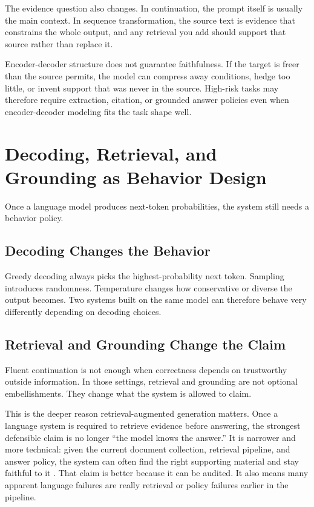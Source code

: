 \begin{practicalnote}
The evidence question also changes. In continuation, the prompt itself is usually the main context. In sequence transformation, the source text is evidence that constrains the whole output, and any retrieval you add should support that source rather than replace it.
\end{practicalnote}

\begin{warningbox}
Encoder-decoder structure does not guarantee faithfulness. If the target is freer than the source permits, the model can compress away conditions, hedge too little, or invent support that was never in the source. High-risk tasks may therefore require extraction, citation, or grounded answer policies even when encoder-decoder modeling fits the task shape well.
\end{warningbox}

\section{Decoding, Retrieval, and Grounding as Behavior Design}

Once a language model produces next-token probabilities, the system still needs a behavior policy.

\subsection{Decoding Changes the Behavior}

Greedy decoding always picks the highest-probability next token. Sampling introduces randomness. Temperature changes how conservative or diverse the output becomes. Two systems built on the same model can therefore behave very differently depending on decoding choices.

\subsection{Retrieval and Grounding Change the Claim}

Fluent continuation is not enough when correctness depends on trustworthy outside information. In those settings, retrieval and grounding are not optional embellishments. They change what the system is allowed to claim.

This is the deeper reason retrieval-augmented generation matters. Once a language system is required to retrieve evidence before answering, the strongest defensible claim is no longer ``the model knows the answer.'' It is narrower and more technical: given the current document collection, retrieval pipeline, and answer policy, the system can often find the right supporting material and stay faithful to it \citep{lewis2020rag}. That claim is better because it can be audited. It also means many apparent language failures are really retrieval or policy failures earlier in the pipeline.

